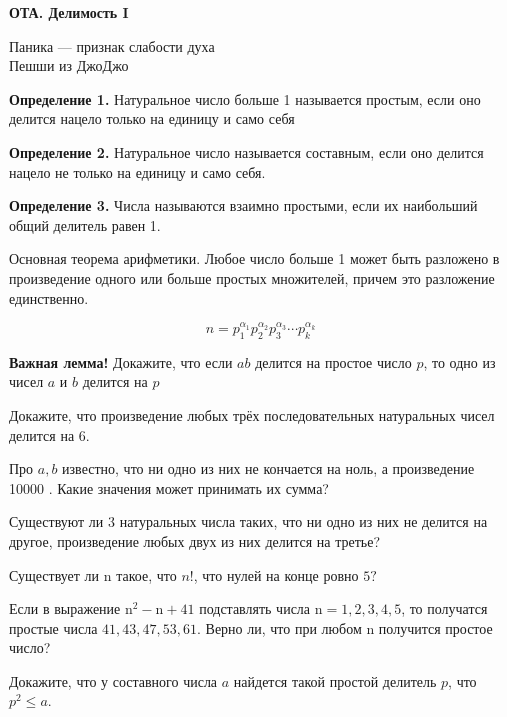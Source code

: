 \centerline{\bf \Huge ОТА. Делимость I}

\begin{flushright}
        \scriptsize{Паника — признак слабости духа\\Пешши из ДжоДжо}
\end{flushright}

\textbf{Определение 1.} Натуральное число больше 1 называется простым, если оно делится нацело только на единицу и само себя

\textbf{Определение 2.} Натуральное число называется составным, если оно делится нацело не только на единицу и само себя.

\textbf{Определение 3.} Числа называются взаимно простыми, если их наибольший общий делитель равен 1.

Основная теорема арифметики. Любое число больше 1 может быть разложено в произведение одного или больше простых множителей, причем это разложение единственно.

$$
n=p_1^{\alpha_1} p_2^{\alpha_2} p_3^{\alpha_3} \cdots p_k^{\alpha_k}
$$

\textbf{Важная лемма!}
Докажите, что если $a b$ делится на простое число $p$, то одно из чисел $a$ и $b$ делится на $p$

Докажите, что произведение любых трёх последовательных натуральных чисел делится на 6.

Про $a, b$ известно, что ни одно из них не кончается на ноль, а произведение 10000 . Какие значения может принимать их сумма?

Существуют ли 3 натуральных числа таких, что ни одно из них не делится на другое, произведение любых двух из них делится на третье?

Существует ли n такое, что $n!$, что нулей на конце ровно $5?$

Если в выражение $\mathrm{n}^2-\mathrm{n}+41$ подставлять числа $\mathrm{n}=1,2,3,4,5$, то получатся простые числа $41,43,47,53,61$. Верно ли, что при любом n получится простое число?

Докажите, что у составного числа $a$ найдется такой простой делитель $p$, что $p^2 \leqslant a$.